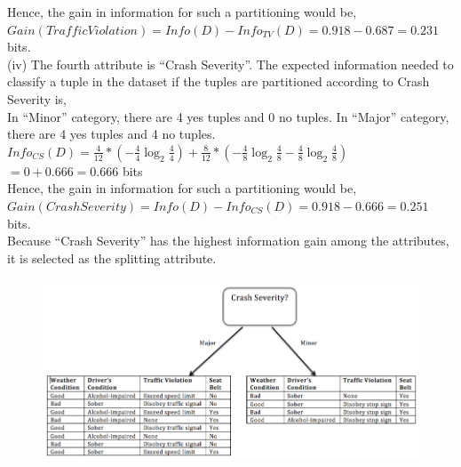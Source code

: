 \documentclass[10pt]{article}
\begin{document}
\begin{flushleft}
\vspace{0.5em}
Hence, the gain in information for such a partitioning would be, \\
\vspace{0.5em}
\hspace{2em} $Gain(Traffic Violation) = Info(D) - Info_{TV}(D) = 0.918 - 0.687 = 0.231$ bits.\\
\vspace{1em}
(iv) The fourth attribute is ``Crash Severity''. The expected information needed to classify a tuple in the dataset if the tuples are partitioned according to Crash Severity is,\\
\vspace{0.5em}
In ``Minor'' category, there are 4 yes tuples and 0 no tuples. In ``Major'' category, there are 4 yes tuples and 4 no tuples.\\
\vspace{0.5em}
\hspace{2em} $Info_{CS}(D) = \frac{4}{12} * (- \frac{4}{4} \log_2 \frac{4}{4}) + \frac{8}{12} * (- \frac{4}{8} \log_2 \frac{4}{8} - \frac{4}{8} \log_2 \frac{4}{8})$\\
\vspace{0.5em}
\hspace{7.3em} $ = 0 + 0.666 = 0.666$ bits\\
\vspace{0.5em}
Hence, the gain in information for such a partitioning would be, \\
\vspace{0.5em}
\hspace{2em} $Gain(Crash Severity) = Info(D) - Info_{CS}(D) = 0.918 - 0.666 = 0.251$ bits.\\
\vspace{1em}
Because ``Crash Severity'' has the highest information gain among the attributes, it is selected as the splitting attribute.\\
\vspace{1em}
\begin{figure}[!htb]
\includegraphics{dt1.png}

\end{figure}
\end{flushleft}
\end{document}

